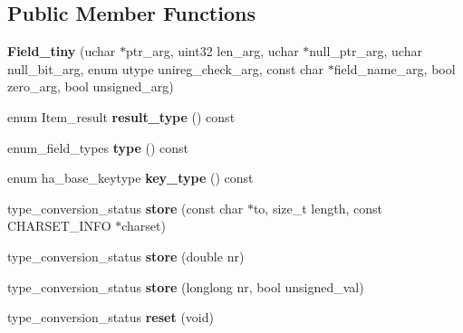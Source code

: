\subsection*{Public Member Functions}
\begin{DoxyCompactItemize}
\item 
\mbox{\label{classField__tiny_a12826abe3a5014cfdb1373f991dfb765}} 
{\bfseries Field\+\_\+tiny} (uchar $\ast$ptr\+\_\+arg, uint32 len\+\_\+arg, uchar $\ast$null\+\_\+ptr\+\_\+arg, uchar null\+\_\+bit\+\_\+arg, enum utype unireg\+\_\+check\+\_\+arg, const char $\ast$field\+\_\+name\+\_\+arg, bool zero\+\_\+arg, bool unsigned\+\_\+arg)
\item 
\mbox{\label{classField__tiny_aeb387f19f7b91c90502bfaaa24131be6}} 
enum Item\+\_\+result {\bfseries result\+\_\+type} () const
\item 
\mbox{\label{classField__tiny_acc0211abc6b1dbc491ff559d3e859e7a}} 
enum\+\_\+field\+\_\+types {\bfseries type} () const
\item 
\mbox{\label{classField__tiny_a8bc0c94893313cd44d1b930325441c8f}} 
enum ha\+\_\+base\+\_\+keytype {\bfseries key\+\_\+type} () const
\item 
\mbox{\label{classField__tiny_a6d4ade6b4f6ffe21907bc9766ec0731f}} 
type\+\_\+conversion\+\_\+status {\bfseries store} (const char $\ast$to, size\+\_\+t length, const C\+H\+A\+R\+S\+E\+T\+\_\+\+I\+N\+FO $\ast$charset)
\item 
\mbox{\label{classField__tiny_a6dfa7f24a8da0511cd1d2cf1b9f02e25}} 
type\+\_\+conversion\+\_\+status {\bfseries store} (double nr)
\item 
\mbox{\label{classField__tiny_add0825723c521ba97b345300abd2e348}} 
type\+\_\+conversion\+\_\+status {\bfseries store} (longlong nr, bool unsigned\+\_\+val)
\item 
\mbox{\label{classField__tiny_a83d3fc5d87b530cc2ca6a958b6a539b1}} 
type\+\_\+conversion\+\_\+status {\bfseries reset} (void)
\item 
\mbox{\label{classField__tiny_afbba13a11840f7f03b52209b45be1e60}} 

\end{DoxyCompactItemize}
